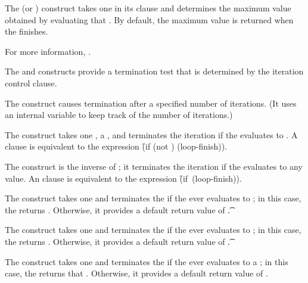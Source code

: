 The  (or ) construct
takes one  in its clause 
and determines the maximum value obtained by evaluating that .
By default, the maximum value is returned when the  finishes.

For more information, \seesection\LOOPValAcc.

\endsubsubsubsection%

 
The  and  constructs provide a termination test
that is determined by the iteration control clause.
 
The  construct causes termination after a specified
number of iterations.
(It uses an internal variable to keep track of the number of iterations.)
 
The  construct takes one , a , 
and terminates the iteration if the  evaluates to .
A  clause is equivalent to the expression 
\f{(if (not ) (loop-finish))}.
 
The  construct is the inverse of ;
it terminates the iteration if the  evaluates to
any  value.
An  clause is equivalent to the expression
\hbox{\f{(if  (loop-finish))}}.
 
The  construct takes one  and
terminates the  if the  ever evaluates to ;
in this case, the   returns \nil.
Otherwise, it provides a default return value of \t.
 
The  construct takes one  and
terminates the  if the  ever evaluates to ;
in this case, the   returns \nil.
Otherwise, it provides a default return value of \t.
 
The  construct takes one  and
terminates the  if the  ever evaluates to
a  ;
in this case, the   returns that .
Otherwise, it provides a default return value of \nil.


